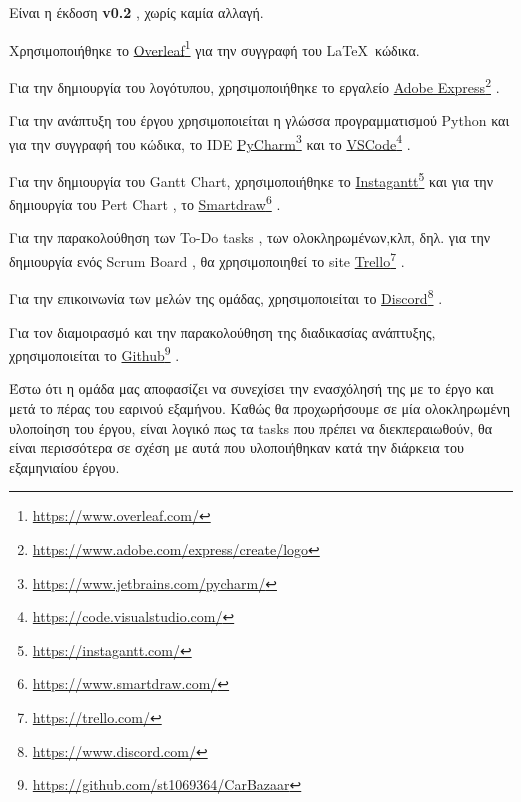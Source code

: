\documentclass{../ol-softwaremanual}
\newcommand{\doclink}[2]{\href{#1}{#2}\footnote{\url{#1}}}
\begin{document}
	\vspace{10pt}
	\flushleft
	
	Είναι η έκδοση \en \textbf{v0.2} \gr, χωρίς καμία αλλαγή.
	
	\vspace{20pt}
	
	
	
	\flushleft
	Χρησιμοποιήθηκε το \en \doclink{https://www.overleaf.com/}{Overleaf} \gr για την συγγραφή του \LaTeX\ κώδικα. \break
	
	Για την δημιουργία του λογότυπου, χρησιμοποιήθηκε το εργαλείο \en \doclink{https://www.adobe.com/express/create/logo}{Adobe Express} . \gr \break
	
	Για την ανάπτυξη του έργου χρησιμοποιείται η γλώσσα προγραμματισμού \en Python \gr και για την συγγραφή του κώδικα, το \en IDE \doclink{https://www.jetbrains.com/pycharm/}{PyCharm} \gr και το \en \doclink{https://code.visualstudio.com/}{VSCode} \gr .         \\ \break
	
	Για την δημιουργία του \en Gantt Chart, \gr χρησιμοποιήθηκε το \en \doclink{https://instagantt.com/}{Instagantt} \gr και για την δημιουργία του \en Pert Chart \gr, το \en \doclink{https://www.smartdraw.com/}{Smartdraw} \gr. \break 
	
	Για την παρακολούθηση των \en To-Do tasks \gr, των ολοκληρωμένων,κλπ, δηλ. για την δημιουργία ενός \en Scrum Board \gr, θα χρησιμοποιηθεί το \en site \doclink{https://trello.com/}{Trello} \gr. \break 
	
	Για την επικοινωνία των μελών της ομάδας, χρησιμοποιείται το \en \doclink{ https://www.discord.com/}{Discord} \gr . \linebreak 
	
	
	Για τον διαμοιρασμό και την παρακολούθηση της διαδικασίας ανάπτυξης, χρησιμοποιείται το \en \doclink{https://github.com/st1069364/CarBazaar}{Github} \gr.
	
	
	
	\newpage
	
	\flushleft
	
	\vspace{20pt}
	
	Έστω ότι η ομάδα μας αποφασίζει να συνεχίσει την ενασχόλησή της με το έργο και μετά το πέρας του εαρινού εξαμήνου. Καθώς θα προχωρήσουμε σε μία ολοκληρωμένη υλοποίηση του έργου, είναι λογικό πως τα \en tasks \gr που πρέπει να διεκπεραιωθούν, θα είναι περισσότερα σε σχέση με αυτά που υλοποιήθηκαν κατά την διάρκεια του εξαμηνιαίου έργου.
	
\end{document}
